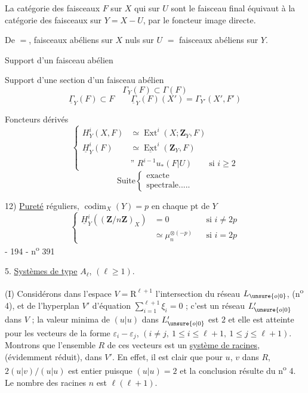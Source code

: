 La catégorie des faisceaux $F$ sur $X$ qui sur $U$ sont le faisceau final équivaut à la catégorie des faisceaux sur $Y=X-U$, par le foncteur image directe.

De $=$, faisceaux abéliens sur $X$ nuls sur $U$ $=$ faisceaux abéliens sur $Y$.

Support d'un faisceau abélien

Support d'une section d'un faisceau abélien
\[
\Gamma_Y(F)\subset\Gamma(F)
\]
\[
\underline\Gamma_Y(F)\subset F
\qquad
\underline\Gamma_Y(F)(X')=\Gamma_{Y'}(X',F')
\]

Foncteurs dérivés
\[
\left\{\begin{aligned}
H^i_Y(X,F)&\simeq\operatorname{Ext}^i(X;\mathbf Z_Y,F)\\
\underline H^i_Y(F)&\simeq\underline{\operatorname{Ext}}^i(\mathbf Z_Y,F)\\
&\text{'' } R^{i-1}u_*(F|U)\qquad\text{si }i\geq2
\end{aligned}\right.
\]
\[
\text{Suite}\left\{\begin{array}{l}\text{exacte}\\\text{spectrale.....}\end{array}\right.
\]

12) \uline{Pureté}
réguliers, $\operatorname{codim}_X(Y)=p$ en chaque pt de $Y$
\[
\left\{\begin{aligned}
\underline H^i_Y((\mathbf Z/n\mathbf Z)_X)&=0&&\text{si }i\neq2p\\
&\simeq\mu_n^{\otimes(-p)}&&\text{si }i=2p
\end{aligned}\right.
\]
- 194 - \hfill n\textsuperscript{o} 391

5. \uline{Systèmes de type} $A_\ell$, $(\ell\geq1)$.

(I) Considérons dans l'espace $V=\mathrm R^{\ell+1}$ l'intersection du réseau $L_{\unsure{o|0}}$, (n\textsuperscript{o} 4), et de l'hyperplan $V'$ d'équation $\sum_{i=1}^{\ell+1}\xi_i=0$ ; c'est un réseau $L'_{\unsure{o|0}}$ dans $V$ ; la valeur minima de $(u|u)$ dans $L'_{\unsure{o|0}}$ est $2$ et elle est atteinte pour les vecteurs de la forme $\varepsilon_i-\varepsilon_j$, $(i\neq j,\ 1\leq i\leq\ell+1,\ 1\leq j\leq\ell+1)$. Montrons que l'ensemble $R$ de ces vecteurs est un \uline{système de racines}, (évidemment réduit), dans $V'$. En effet, il est clair que pour $u$, $v$ dans $R$, $2(u|v)/(u|u)$ est entier puisque $(u|u)=2$ et la conclusion résulte du n\textsuperscript{o} 4. Le nombre des racines $n$ est $\ell(\ell+1)$.

